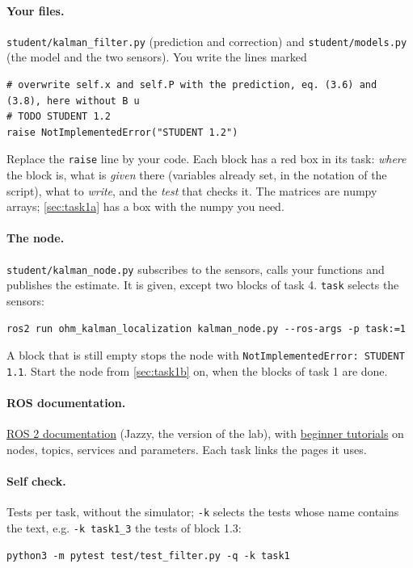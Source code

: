 \documentclass[11pt,a4paper,parskip=half]{scrartcl}
\newcommand{\thema}[1]{\texttt{#1}}
\newcommand{\datei}[1]{\texttt{#1}}
\begin{document}
\paragraph{Your files.} \datei{student/kalman\_filter.py} (prediction and correction) and
\datei{student/models.py} (the model and the two sensors). You write the lines marked
\begin{lstlisting}
# overwrite self.x and self.P with the prediction, eq. (3.6) and (3.8), here without B u
# TODO STUDENT 1.2
raise NotImplementedError("STUDENT 1.2")
\end{lstlisting}
Replace the \thema{raise} line by your code. Each block has a red box in its task: \emph{where} the block is,
what is \emph{given} there (variables already set, in the notation of the script), what to \emph{write}, and the
\emph{test} that checks it. The matrices are numpy arrays; \cref{sec:task1a} has a box with the numpy you need.

\paragraph{The node.} \datei{student/kalman\_node.py} subscribes to the sensors, calls your functions and
publishes the estimate. It is given, except two blocks of task 4. \thema{task} selects the sensors:
\begin{lstlisting}
ros2 run ohm_kalman_localization kalman_node.py --ros-args -p task:=1
\end{lstlisting}
A block that is still empty stops the node with \thema{NotImplementedError: STUDENT 1.1}. Start the node from
\cref{sec:task1b} on, when the blocks of task 1 are done.

\paragraph{ROS documentation.} \href{https://docs.ros.org/en/jazzy/}{ROS 2 documentation} (Jazzy, the version
of the lab), with \href{https://docs.ros.org/en/jazzy/Tutorials/Beginner-CLI-Tools.html}{beginner tutorials} on
nodes, topics, services and parameters. Each task links the pages it uses.

\paragraph{Self check.} Tests per task, without the simulator; \thema{-k} selects the tests whose name contains
the text, e.g. \thema{-k task1\_3} the tests of block 1.3:
\begin{lstlisting}
python3 -m pytest test/test_filter.py -q -k task1
\end{lstlisting}
\end{document}
